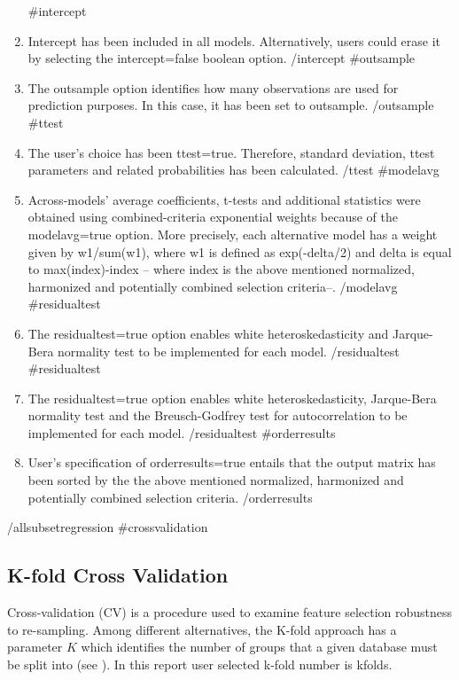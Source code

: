\documentclass{article}
\begin{document}
\begin{enumerate}
  {{#intercept}}
  \item Intercept has been included in all models. Alternatively, users could erase it by selecting the intercept=false boolean option.
  {{/intercept}}
  {{#outsample}}
  \item The outsample option identifies how many observations are used for prediction purposes. In this case, it has been set to {{outsample}}.
  {{/outsample}}
  {{#ttest}}
  \item The user's choice has been ttest=true. Therefore, standard deviation, ttest parameters and related probabilities has been calculated.
  {{/ttest}}
  {{#modelavg}}
  \item Across-models' average coefficients, t-tests and additional statistics were obtained using combined-criteria exponential weights because of the modelavg=true option. More precisely, each alternative model has a weight given by w1/sum(w1), where w1 is defined as exp(-delta/2) and delta is equal to max(index)-index -- where index is the above mentioned normalized, harmonized and potentially combined selection criteria--.
  {{/modelavg}}
  {{#residualtest}}
  \item The residualtest=true option enables white heteroskedasticity and Jarque-Bera normality test to be implemented for each model.
  {{/residualtest}}
  {{#residualtest}}
  \item The residualtest=true option enables white heteroskedasticity, Jarque-Bera normality test and the Breusch-Godfrey test for autocorrelation to be implemented for each model.
  {{/residualtest}}
  {{#orderresults}}  
  \item User's specification of orderresults=true entails that the output matrix has been sorted by the the above mentioned normalized, harmonized and potentially combined selection criteria.
  {{/orderresults}}
\end{enumerate}
{{/allsubsetregression}}
{{#crossvalidation}}
\subsection{K-fold Cross Validation}

Cross-validation (CV) is a procedure used to examine feature selection robustness to re-sampling. Among different alternatives, the K-fold approach has a parameter $K$ which identifies the number of groups that a given database must be split into (see \cite{arlot2010}). In this report user selected k-fold number is {{kfolds}}.
\end{document}
